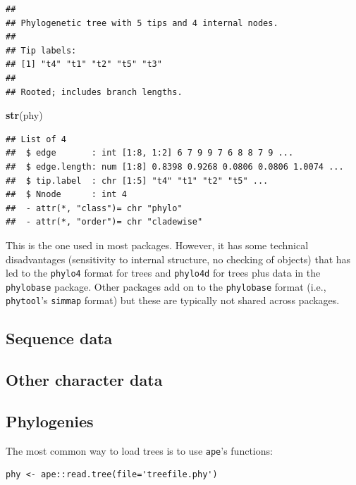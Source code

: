 \documentclass[]{article}
\newenvironment{Shaded}{\begin{snugshade}}{\end{snugshade}}
\newcommand{\KeywordTok}[1]{\textcolor[rgb]{0.13,0.29,0.53}{\textbf{#1}}}
\newcommand{\NormalTok}[1]{#1}
\theoremstyle{definition}
\theoremstyle{definition}
\theoremstyle{definition}
\theoremstyle{remark}
\begin{document}
\begin{verbatim}
## 
## Phylogenetic tree with 5 tips and 4 internal nodes.
## 
## Tip labels:
## [1] "t4" "t1" "t2" "t5" "t3"
## 
## Rooted; includes branch lengths.
\end{verbatim}

\begin{Shaded}
\begin{Highlighting}[]
\KeywordTok{str}\NormalTok{(phy)}
\end{Highlighting}
\end{Shaded}

\begin{verbatim}
## List of 4
##  $ edge       : int [1:8, 1:2] 6 7 9 9 7 6 8 8 7 9 ...
##  $ edge.length: num [1:8] 0.8398 0.9268 0.0806 0.0806 1.0074 ...
##  $ tip.label  : chr [1:5] "t4" "t1" "t2" "t5" ...
##  $ Nnode      : int 4
##  - attr(*, "class")= chr "phylo"
##  - attr(*, "order")= chr "cladewise"
\end{verbatim}

This is the one used in most packages. However, it has some technical
disadvantages (sensitivity to internal structure, no checking of
objects) that has led to the \texttt{phylo4} format for trees and
\texttt{phylo4d} for trees plus data in the \texttt{phylobase} package.
Other packages add on to the \texttt{phylobase} format (i.e.,
\texttt{phytool}'s \texttt{simmap} format) but these are typically not
shared across packages.

\hypertarget{sequence-data}{%
\subsection{Sequence data}\label{sequence-data}}

\hypertarget{other-character-data}{%
\subsection{Other character data}\label{other-character-data}}

\hypertarget{phylogenies}{%
\subsection{Phylogenies}\label{phylogenies}}

The most common way to load trees is to use \texttt{ape}'s functions:

\begin{verbatim}
phy <- ape::read.tree(file='treefile.phy')
\end{verbatim}
\end{document}
